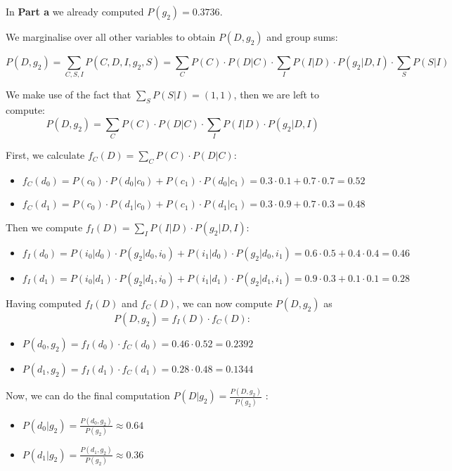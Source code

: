 \documentclass[11pt,a4paper]{article}
\begin{document}
	In \textbf{Part a} we already computed $P(g_2) = 0.3736. $
	
	We marginalise over all other variables to obtain $P(D , g_2)$ and group sums:
	
	$$ P(D, g_2) = \sum_{C,S,I}P(C,D,I, g_2,S) = \sum_{C}P(C)\cdot P(D|C)\cdot \sum_{I}P(I|D) \cdot P(g_2|D,I) \cdot \sum_{S}P(S|I)$$
	
	We make use of the fact that $ \sum_{S}P(S|I) = (1, 1)$, then we are left to compute:
	$$ P(D,g_2)  = \sum_{C}P(C)\cdot P(D|C)\cdot \sum_{I}P(I|D) \cdot P(g_2|D,I)$$
	
	
	First, we calculate $ f_C(D) = \sum_{C}P(C) \cdot P(D|C): $
	\begin{itemize}
		\item $f_C(d_0) = P(c_0) \cdot P(d_0|c_0) + P(c_1) \cdot P(d_0|c_1) = 0.3 \cdot 0.1+0.7 \cdot 0.7 = 0.52$
		\item $f_C(d_1) = P(c_0) \cdot P(d_1|c_0) + P(c_1) \cdot P(d_1|c_1) = 0.3 \cdot 0.9 + 0.7 \cdot 0.3 = 0.48$
	\end{itemize}
	
	Then we compute $f_I(D) =  \sum_{I}P(I|D)\cdot P(g_2|D,I): $
	\begin{itemize}
		\item $f_I(d_0) = P(i_0|d_0) \cdot P(g_2|d_0,i_0) + P(i_1|d_0) \cdot P(g_2|d_0,i_1) = 0.6 \cdot 0.5 + 0.4 \cdot 0.4 = 0.46$
		\item $f_I(d_1) = P(i_0|d_1) \cdot P(g_2|d_1,i_0) + P(i_1|d_1) \cdot P(g_2|d_1,i_1)  = 0.9 \cdot 0.3 + 0.1 \cdot 0.1 = 0.28$
	\end{itemize} 
	
	Having computed $f_I(D)$ and $f_C(D)$, we can now compute $P(D,g_2)$ as $$P(D,g_2) = f_I(D) \cdot f_C(D): $$
	
	\begin{itemize}
		\item $P(d_0,g_2) = f_I(d_0) \cdot f_C(d_0) = 0.46  \cdot 0.52 = 0.2392 $
		\item $P(d_1,g_2) = f_I(d_1) \cdot f_C(d_1)  = 0.28  \cdot 0.48 = 0.1344 $
	\end{itemize}
	
	Now, we can do the final computation $ P(D | g_2) = \frac{P(D, g_2)}{P(g_2)} $ :
	\begin{itemize}
		\item $P(d_0|g_2) = \frac{P(d_0,g_2)}{P(g_2)} \approx 0.64 $
		\item $P(d_1|g_2) = \frac{P(d_1,g_2)}{P(g_2)} \approx 0.36 $
	\end{itemize}
	
\end{document}
